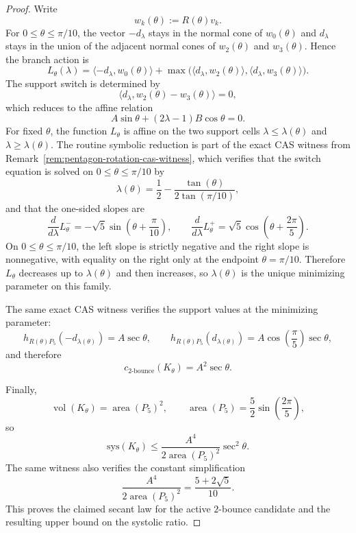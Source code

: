 \begin{unverified}
\begin{proof}
Write
\[
  w_k(\theta) := R(\theta)v_k.
\]
For $0 \le \theta \le \pi/10$, the vector $-d_\lambda$ stays in the normal cone
of $w_0(\theta)$ and $d_\lambda$ stays in the union of the adjacent normal
cones of $w_2(\theta)$ and $w_3(\theta)$. Hence the branch action is
\[
  L_\theta(\lambda)
  =
  \langle -d_\lambda, w_0(\theta)\rangle
  +
  \max\bigl(
    \langle d_\lambda, w_2(\theta)\rangle,
    \langle d_\lambda, w_3(\theta)\rangle
  \bigr).
\]
The support switch is determined by
\[
  \langle d_\lambda, w_2(\theta)-w_3(\theta)\rangle = 0,
\]
which reduces to the affine relation
\[
  A\sin\theta + (2\lambda-1)B\cos\theta = 0.
\]
For fixed $\theta$, the function $L_\theta$ is affine on the two support cells
$\lambda \le \lambda(\theta)$ and $\lambda \ge \lambda(\theta)$. The routine
symbolic reduction is part of the exact CAS witness from
Remark~\ref{rem:pentagon-rotation-cas-witness}, which verifies that the switch
equation is solved on $0 \le \theta \le \pi/10$ by
\[
  \lambda(\theta)
  =
  \frac{1}{2} - \frac{\tan(\theta)}{2\tan(\pi/10)},
\]
and that the one-sided slopes are
\[
  \frac{d}{d\lambda} L_\theta^{-}
  =
  -\sqrt{5}\sin\left(\theta+\frac{\pi}{10}\right),
  \qquad
  \frac{d}{d\lambda} L_\theta^{+}
  =
  \sqrt{5}\cos\left(\theta+\frac{2\pi}{5}\right).
\]
On $0 \le \theta \le \pi/10$, the left slope is strictly negative and the right
slope is nonnegative, with equality on the right only at the endpoint
$\theta=\pi/10$. Therefore $L_\theta$ decreases up to $\lambda(\theta)$ and
then increases, so $\lambda(\theta)$ is the unique minimizing parameter on this
family.

The same exact CAS witness verifies the support values at the minimizing
parameter:
\[
  h_{R(\theta)P_5}(-d_{\lambda(\theta)}) = A\sec\theta,
  \qquad
  h_{R(\theta)P_5}(d_{\lambda(\theta)})
  =
  A\cos\left(\frac{\pi}{5}\right)\sec\theta,
\]
and therefore
\[
  c_{2\text{-bounce}}(K_\theta)
  =
  A^2\sec\theta.
\]

Finally,
\[
  \operatorname{vol}(K_\theta)=\operatorname{area}(P_5)^2,
  \qquad
  \operatorname{area}(P_5)=\frac{5}{2}\sin\left(\frac{2\pi}{5}\right),
\]
so
\[
  \mathrm{sys}(K_\theta)
  \le
  \frac{A^4}{2\operatorname{area}(P_5)^2}\sec^2\theta.
\]
The same witness also verifies the constant simplification
\[
  \frac{A^4}{2\operatorname{area}(P_5)^2}
  =
  \frac{5+2\sqrt{5}}{10}.
\]
This proves the claimed secant law for the active $2$-bounce candidate and the
resulting upper bound on the systolic ratio.
\end{proof}
\end{unverified}

